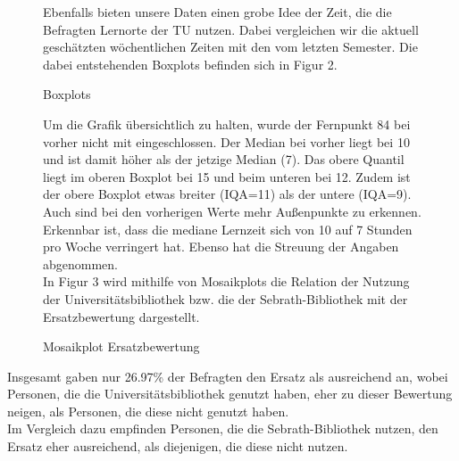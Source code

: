 \documentclass[11pt, a4paper]{article}
\begin{document}
\begin{figure}[htp]
	Ebenfalls bieten unsere Daten einen grobe Idee der Zeit, die die Befragten Lernorte der TU nutzen.
	Dabei vergleichen wir die aktuell geschätzten wöchentlichen Zeiten mit den vom letzten Semester.
	 Die dabei entstehenden Boxplots befinden sich in Figur 2.\\
	\vspace{-1.5cm}
	\hspace{-0.8cm}
	{\centering} 
	\vspace{0cm}
	\caption{Boxplots}
	\vspace{0.7cm}
	\raggedright
	Um die Grafik übersichtlich zu halten, wurde der Fernpunkt 84 bei vorher nicht mit eingeschlossen. 
	Der Median bei vorher liegt bei 10 und ist damit höher als der jetzige Median (7).
	Das obere Quantil liegt im oberen Boxplot bei 15 und beim unteren bei 12.
	Zudem ist der obere Boxplot etwas breiter (IQA=11) als der untere (IQA=9).
	Auch sind bei den vorherigen Werte mehr Außenpunkte zu erkennen.
	Erkennbar ist, dass die mediane Lernzeit sich von 10 auf 7 Stunden pro Woche verringert hat. Ebenso hat die Streuung der Angaben abgenommen.\\
	In Figur 3 wird mithilfe von Mosaikplots die Relation der Nutzung der Universitätsbibliothek bzw. die der Sebrath-Bibliothek mit der Ersatzbewertung dargestellt.
	\vspace{0.5cm}
	{\centering }
	\vspace{-1.5cm}
	\caption{Mosaikplot Ersatzbewertung}
\end{figure}

\leavevmode
\newpage
Insgesamt gaben nur 26.97\% der Befragten den Ersatz als ausreichend an, wobei Personen, die die Universitätsbibliothek genutzt haben, eher zu dieser Bewertung neigen, als Personen, die diese nicht genutzt haben. \\ %
Im Vergleich dazu empfinden Personen, die die Sebrath-Bibliothek nutzen, den Ersatz eher ausreichend, als diejenigen, die diese nicht nutzen. %
\end{document}
